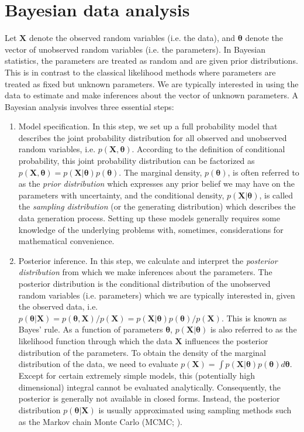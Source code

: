\documentclass[floatsintext, man]{apa7}
\begin{document}
\section{Bayesian data analysis}
Let $\bm{X}$ denote the observed random variables (i.e. the data), and $
\bm{\theta}$ denote the vector of unobserved random variables (i.e. the
parameters). In Bayesian statistics, the parameters are treated as random and
are given prior distributions. This is in contrast to the classical likelihood
methods where parameters are treated as fixed but unknown parameters. We are
typically interested in using the data to estimate and make inferences about the
vector of unknown parameters. A Bayesian analysis involves three essential
steps:
\begin{enumerate}
  \item Model specification. In this step, we set up a full probability model
  that describes the joint probability distribution for all observed and
  unobserved random variables, i.e. $p(\bm{X}, \bm{\theta})$. According to the
  definition of conditional probability, this joint probability distribution can
  be factorized as $p(\bm{X}, \bm{\theta}) = p(\bm{X}|\bm{\theta})p(
  \bm{\theta})$. The marginal density, $p(\bm{\theta})$, is often referred to as
  the \textit{prior distribution} which expresses any prior belief we may have
  on the parameters with uncertainty, and the conditional density, $p(\bm{X}|
  \bm{\theta})$, is called the \textit{sampling distribution} (or the generating
  distribution) which describes the data generation process. Setting up these
  models generally requires some knowledge of the underlying problems with,
  sometimes, considerations for mathematical convenience.

  \item Posterior inference. In this step, we calculate and interpret the
  \textit{posterior distribution} from which we make inferences about the
  parameters. The posterior distribution is the conditional
  distribution of the unobserved random variables (i.e. parameters) which we are
  typically interested in, given the observed data, i.e. $p(\bm{\theta}|\bm{X})
  = p(\bm{\theta}, \bm{X}) / p(\bm{X}) = p(\bm{X}|\bm{\theta})p(\bm{\theta}) /
  p(\bm{X})$. This is known as Bayes' rule. As a function of parameters $
  \bm{\theta}$, $p(\bm{X}|\bm{\theta})$ is also referred to as the likelihood
  function through which the data $\bm{X}$ influences the posterior distribution
  of the parameters. To obtain the density of the marginal distribution of the
  data, we need to evaluate $p(\bm{X}) = \int p(\bm{X}|\bm{\theta})p(
  \bm{\theta}) d\bm{\theta}$. Except for certain extremely simple models, this 
  (potentially high dimensional) integral cannot be evaluated analytically.
  Consequently, the posterior is generally not available in closed forms.
  Instead, the posterior distribution $p(\bm{\theta}|\bm{X})$ is usually
  approximated using sampling methods such as the Markov chain Monte Carlo 
  (MCMC; \cite{neal_probabilistic_1998,gelman_bayesian_2013}).


\end{enumerate}
\end{document}
